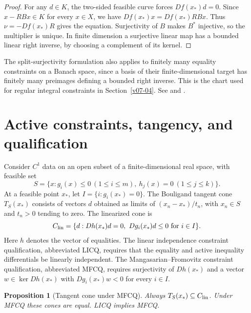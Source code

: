 \documentclass[11pt,oneside,openany]{book}
\theoremstyle{plain}
\newtheorem{proposition}[theorem]{Proposition}
\theoremstyle{definition}
\theoremstyle{remark}
\begin{document}
\begin{proof}
For any \(d\in K\), the two-sided feasible curve
forces \(Df(x_*)d=0\). Since \(x-RBx\in K\) for
every \(x\in X\), we have \(Df(x_*)x=Df(x_*)RBx\).
Thus \(\nu=-Df(x_*)R\) gives the equation.
Surjectivity of \(B\) makes \(B^*\) injective,
so the multiplier is unique. In finite dimension a
surjective linear map has a bounded linear right
inverse, by choosing a complement of its kernel.
\end{proof}

The split-surjectivity formulation also applies to
finitely many equality constraints on a Banach
space, since a basis of their finite-dimensional
target has finitely many preimages defining a
bounded right inverse. This is the chart used for
regular integral constraints in
Section~\ref{v07-04}. See
\cite[Section 1.2.2]{Liberzon} and
\cite[Section 12.3]{NocedalWright}.

\section{Active constraints, tangency, and qualification}
\label{v06-03}

Consider \(C^1\) data on an open subset of a
finite-dimensional real space, with feasible set
\[
 S=\{x:g_i(x)\le0\ (1\le i\le m),\
                  h_j(x)=0\ (1\le j\le k)\}.
\]
At a feasible point \(x_*\), let
\(I=\{i:g_i(x_*)=0\}\).
The Bouligand tangent cone \(T_S(x_*)\) consists of
vectors \(d\) obtained as limits of
\((x_n-x_*)/t_n\), with \(x_n\in S\) and
\(t_n>0\) tending to zero. The linearized cone is
\[
 C_{\rm lin}
 =\{d:Dh(x_*)d=0,\ Dg_i(x_*)d\le0\text{ for }i\in I\}.
\]
Here \(h\) denotes the vector of equalities. The
linear independence constraint qualification,
abbreviated LICQ, requires that the equality and
active inequality differentials be linearly independent.
The Mangasarian--Fromovitz constraint qualification,
abbreviated MFCQ, requires surjectivity of \(Dh(x_*)\)
and a vector \(w\in\ker Dh(x_*)\) with
\(Dg_i(x_*)w<0\) for every \(i\in I\).

\begin{proposition}[Tangent cone under MFCQ]\label{prop:tangent-mfcq}
Always \(T_S(x_*)\subseteq C_{\rm lin}\).
Under MFCQ these cones are equal.
LICQ implies MFCQ.
\end{proposition}
\end{document}
